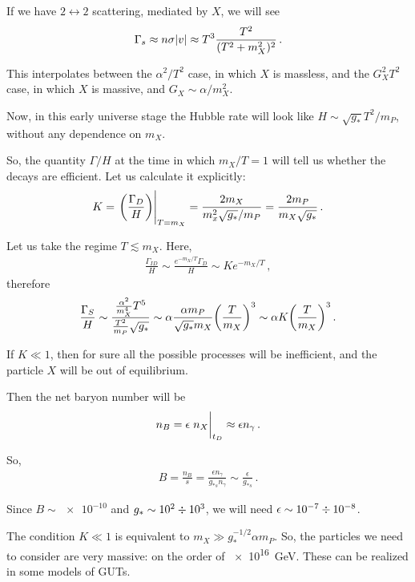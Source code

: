 \documentclass[main.tex]{subfiles}
\begin{document}
If we have \(2 \leftrightarrow 2\) scattering, mediated by \(X\), we will see 
%
\begin{align}
\Gamma _s \approx n \sigma \abs{v} \approx T^3 \frac{T^2}{(T^2 + m_X^2)^2}
\,.
\end{align}

This interpolates between the \(\alpha^2 / T^2\) case, in which \(X\) is massless, and the \(G_X^2 T^2\) case, in which \(X \) is massive, and \(G_X \sim \alpha / m_X^2\). 

Now, in this early universe stage the Hubble rate will look like \(H \sim \sqrt{g_*} T^2 / m_P\), without any dependence on \(m_X\).

So, the quantity \(\Gamma / H\) at the time in which \(m_X / T = 1\) will tell us whether the decays are efficient. 
Let us calculate it explicitly: 
%
\begin{align}
K = \eval{\qty(\frac{\Gamma _D}{H})}_{T = m_X} = \frac{2 m_X}{m_x^2 \sqrt{g_*} / m_P} = \frac{2 m_P}{m_X \sqrt{g_*}}
\,.
\end{align}

Let us take the regime \(T \lesssim m_X\). Here, 
%
\begin{align}
\frac{\Gamma_{ID}}{H} \sim \frac{e^{-m_X / T} \Gamma _D}{H} \sim K e^{-m_X / T}
\,,
\end{align}
%
therefore 
%
\begin{align}
\frac{\Gamma_{S}}{H} \sim\frac{ \frac{\alpha^2}{m_X^{4}} T^{5}}{ \frac{T^2}{m_P} \sqrt{g_*}} 
\sim \alpha \frac{\alpha m_P}{\sqrt{g_*} m_X} \qty( \frac{T}{m_X})^{3}
\sim \alpha K \qty( \frac{T}{m_X})^{3}
\,.
\end{align}

If \(K \ll 1\), then for sure all the possible processes will be inefficient, and the particle \(X\) will be out of equilibrium. 

Then the net baryon number will be 
%
\begin{align}
n_B = \epsilon \eval{n_X}_{t_D} \approx \epsilon n_\gamma 
\,.
\end{align}

So, 
%
\begin{align}
B = \frac{n_B}{s} = \frac{\epsilon n_\gamma }{g_{*s} n_\gamma } \sim \frac{\epsilon}{g_{*s}}
\,.
\end{align}

Since \(B \sim \num{e-10}\) and \(g_* \sim \num{e2} \divisionsymbol \num{e3}\), we will need \(\epsilon \sim \num{e-7} \divisionsymbol \num{e-8}\). 

The condition \(K \ll 1\) is equivalent to \(m_X \gg g_*^{-1/2} \alpha m_P\). 
So, the particles we need to consider are very massive: on the order of \SI{e16}{GeV}. These can be realized in some models of GUTs.
\end{document}
